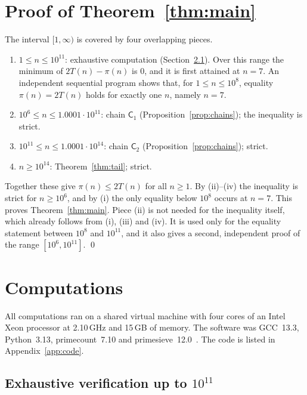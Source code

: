 \documentclass[11pt,a4paper]{article}
\theoremstyle{definition}
\begin{document}
\section{\texorpdfstring{Proof of Theorem~\ref{thm:main}}{Proof of the main theorem}}\label{sec:proof}

The interval $[1,\infty)$ is covered by four overlapping pieces.

\begin{enumerate}
\item[(i)] $1\le n\le10^{11}$: exhaustive computation (Section~\ref{sec:exhaustive}). Over this range the minimum of $2T(n)-\pi(n)$ is $0$, and it is first attained at $n=7$. An independent sequential program shows that, for $1\le n\le10^{8}$, equality $\pi(n)=2T(n)$ holds for exactly one $n$, namely $n=7$.
\item[(ii)] $10^{6}\le n\le 1.0001\cdot10^{11}$: chain $\mathsf C_1$ (Proposition~\ref{prop:chains}); the inequality is strict.
\item[(iii)] $10^{11}\le n\le 1.0001\cdot10^{14}$: chain $\mathsf C_2$ (Proposition~\ref{prop:chains}); strict.
\item[(iv)] $n\ge10^{14}$: Theorem~\ref{thm:tail}; strict.
\end{enumerate}

Together these give $\pi(n)\le 2T(n)$ for all $n\ge1$. By (ii)--(iv) the inequality is strict for $n\ge10^6$, and by (i) the only equality below $10^{8}$ occurs at $n=7$. This proves Theorem~\ref{thm:main}. Piece (ii) is not needed for the inequality itself, which already follows from (i), (iii) and (iv). It is used only for the equality statement between $10^8$ and $10^{11}$, and it also gives a second, independent proof of the range $[10^6,10^{11}]$. \qed

\section{Computations}\label{sec:computations}

All computations ran on a shared virtual machine with four cores of an Intel Xeon processor at 2.10\,GHz and 15\,GB of memory. The software was GCC~13.3, Python~3.13, primecount~7.10 and primesieve~12.0~\cite{primecount}. The code is listed in Appendix~\ref{app:code}.

\subsection{Exhaustive verification up to \texorpdfstring{$10^{11}$}{1e11}}\label{sec:exhaustive}
\end{document}
